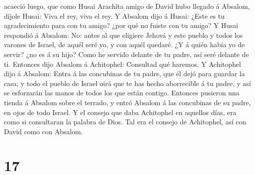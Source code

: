 acaeció luego, que como Husai Arachîta amigo de David hubo llegado á
Absalom, díjole Husai: Viva el rey, viva el rey.  Y Absalom
dijo á Husai: ¿Este es tu agradecimiento para con tu amigo? ¿por qué no
fuiste con tu amigo?  Y Husai respondió á Absalom: No:
antes al que eligiere Jehová y este pueblo y todos los varones de
Israel, de aquél seré yo, y con aquél quedaré.  ¿Y á quién
había yo de servir? ¿no es á su hijo? Como he servido delante de tu
padre, así seré delante de ti.  Entonces dijo Absalom á
Achitophel: Consultad qué haremos.  Y Achitophel dijo á
Absalom: Entra á las concubinas de tu padre, que él dejó para guardar la
casa; y todo el pueblo de Israel oirá que te has hecho aborrecible á tu
padre, y así se esforzarán las manos de todos los que están contigo.
 Entonces pusieron una tienda á Absalom sobre el terrado, y
entró Absalom á las concubinas de su padre, en ojos de todo Israel.
 Y el consejo que daba Achitophel en aquellos días, era
como si consultaran la palabra de Dios. Tal era el consejo de
Achitophel, así con David como con Absalom.

\hypertarget{section-16}{%
\section{17}\label{section-16}}

